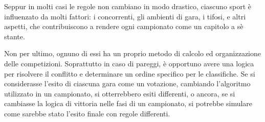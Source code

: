 \documentclass[12pt,a4paper,openright,twoside]{book}
\begin{document}
Seppur in molti casi le regole non cambiano in modo drastico, ciascuno sport è influenzato da molti fattori:
i concorrenti, gli ambienti di gara, i tifosi, e altri aspetti, che contribuiscono a rendere 
ogni campionato come un capitolo a sè stante. 

Non per ultimo, ognuno di essi ha un proprio metodo di calcolo ed organizzazione delle competizioni. 
Soprattutto in caso di pareggi, è opportuno avere una logica per risolvere il conflitto e determinare un ordine specifico per
le classifiche. 
Se si considerasse l'esito di ciascuna gara come un votazione, cambiando
l'algoritmo utilizzato in un campionato, si otterrebbero esiti differenti, o ancora,
se si cambiasse la logica di vittoria nelle fasi di un campionato, si potrebbe simulare come
sarebbe stato l'esito finale con regole differenti.
\end{document}
